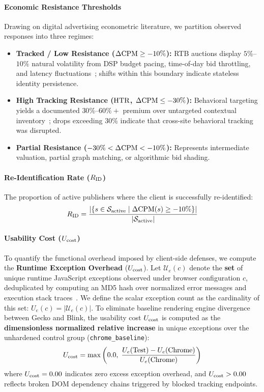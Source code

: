 \paragraph{Economic Resistance Thresholds}
Drawing on digital advertising econometric literature, we partition observed responses into three regimes:
\begin{itemize}
    \item \textbf{Tracked / Low Resistance ($\Delta\text{CPM} \ge -10\%$):} RTB auctions display $5\%$--$10\%$ natural volatility from DSP budget pacing, time-of-day bid throttling, and latency fluctuations~\cite{barysei2023investigating}; shifts within this boundary indicate stateless identity persistence.
    \item \textbf{High Tracking Resistance ($\text{HTR}$, $\Delta\text{CPM} \le -30\%$):} Behavioral targeting yields a documented $30\%$--$60\%+$ premium over untargeted contextual inventory~\cite{beales2014empirical, johnson2020consumer, google2019cookie}; drops exceeding $30\%$ indicate that cross-site behavioral tracking was disrupted.
    \item \textbf{Partial Resistance ($-30\% < \Delta\text{CPM} < -10\%$):} Represents intermediate valuation, partial graph matching, or algorithmic bid shading.
\end{itemize}

\paragraph{Re-Identification Rate ($R_{\text{ID}}$)}
The proportion of active publishers where the client is successfully re-identified:
\begin{equation}
R_{\text{ID}} = \frac{\left| \{ s \in \mathcal{S}_{\text{active}} \mid \Delta\text{CPM}(s) \ge -10\% \} \right|}{|\mathcal{S}_{\text{active}}|}
\end{equation}

\paragraph{Usability Cost ($U_{\text{cost}}$)}
To quantify the functional overhead imposed by client-side defenses, we compute the \textbf{Runtime Exception Overhead} ($U_{\text{cost}}$). 
Let $\mathcal{U}_e(c)$ denote the \textbf{set} of unique runtime JavaScript exceptions observed under browser configuration $c$, deduplicated by computing an MD5 hash over normalized error messages and execution stack traces~\cite{iqbal2020adgraph}. 
We define the scalar exception count as the cardinality of this set: $U_e(c) = |\mathcal{U}_e(c)|$. To eliminate baseline rendering engine divergence between Gecko and Blink, the usability cost $U_{\text{cost}}$ is computed as the \textbf{dimensionless normalized relative increase} in unique exceptions over the unhardened control group (\texttt{chrome\_baseline}):
\begin{equation}
U_{\text{cost}} = \max\left(0.0,\; \frac{U_e(\text{Test}) - U_e(\text{Chrome})}{U_e(\text{Chrome})}\right)
\end{equation}
where $U_{\text{cost}} = 0.00$ indicates zero excess exception overhead, and $U_{\text{cost}} > 0.00$ reflects broken DOM dependency chains triggered by blocked tracking endpoints.

